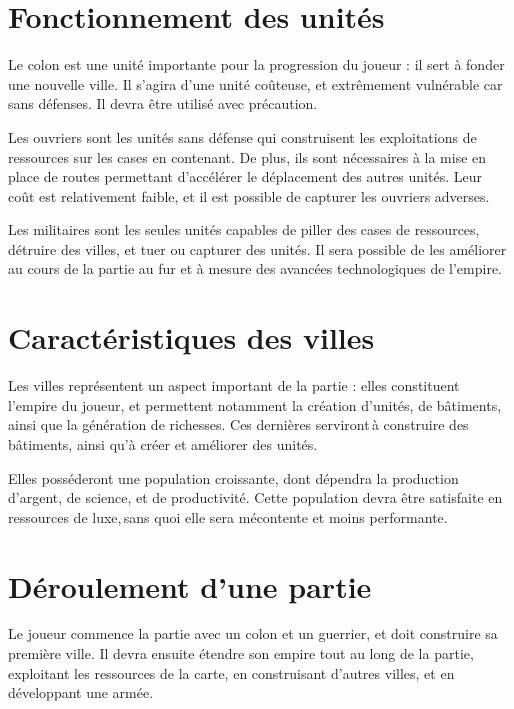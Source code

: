 \documentclass[12pt]{report}
\begin{document}
\newpage

\section{Fonctionnement des unités}

Le colon est une unité importante pour la progression du joueur : il sert à fonder une nouvelle ville. Il s'agira d'une unité coûteuse, et extrêmement vulnérable car sans défenses. Il devra être utilisé avec précaution.

Les ouvriers sont les unités sans défense qui construisent les exploitations de ressources sur les cases en contenant. De plus, ils sont nécessaires à la mise en place de routes permettant d’accélérer le déplacement des autres unités. Leur coût est relativement faible, et il est possible de capturer les ouvriers adverses.

Les militaires sont les seules unités capables de piller des cases de ressources, détruire des villes, et tuer ou capturer des unités. Il sera possible de les améliorer au cours de la partie au fur et à mesure des avancées technologiques de l’empire.

\section{Caractéristiques des villes}

Les villes représentent un aspect important de la partie : elles constituent l'empire du joueur, et permettent notamment la création d'unités, de bâtiments, ainsi que la génération de richesses. Ces dernières serviront à cons\-truire des bâtiments, ainsi qu’à créer et améliorer des unités.

Elles posséderont une population croissante, dont dépendra la production d'argent, de science, et de productivité. Cette population devra être satisfaite en ressources de luxe, sans quoi elle sera mécontente et moins performante.

\newpage

\section{Déroulement d'une partie}

Le joueur commence la partie avec un colon et un guerrier, et doit construire sa première ville. Il devra ensuite étendre son empire tout au long de la partie, exploitant les ressources de la carte, en construisant d'autres villes, et en développant une armée.
\end{document}
